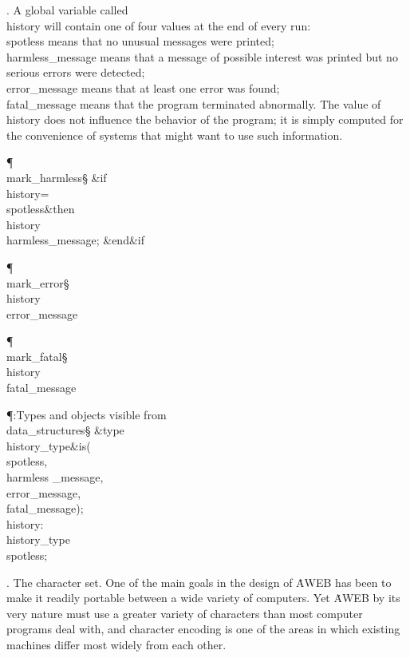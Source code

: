 . A global variable called \\{history} will contain one of four values
at the end of every run: \\{spotless} means that no unusual messages were
printed; \\{harmless\_message} means that a message of possible interest
was printed but no serious errors were detected; \\{error\_message} means that
at least one error was found; \\{fatal\_message} means that the program
terminated abnormally. The value of \\{history} does not influence the
behavior of the program; it is simply computed for the convenience
of systems that might want to use such information.

\Y\P\4\D\\{mark\_harmless}\?\S\?\6
\&{if}\1\1\8\\{history}\?=\?\\{spotless}\2\8\&{then}\6
\\{history}\?\K\?\\{harmless\_message};\2\6
\&{end}\8\2\&{if}\1\par
\P\4\D\\{mark\_error}\?\S\?\\{history}\?\K\?\\{error\_message}\par
\P\4\D\\{mark\_fatal}\?\S\?\\{history}\?\K\?\\{fatal\_message}\par
\Y\P\?\4:Types and objects visible from \\{data\_structures}\X\mathrel{+}\S%
\?\6
\&{type}\8\\{history\_type}\8\&{is}\?\8\1(\?\\{spotless}\?,\?\\{harmless%
\_message}\?,\?\\{error\_message}\?,\?\\{fatal\_message}\?\2)\?;\6
\\{history}\?:\?\\{history\_type}\?\K\?\\{spotless};%
\par
\fi

.  The character set.
One of the main goals in the design of \.{AWEB} has been to make it readily
portable between a wide variety of computers. Yet \.{AWEB} by its very
nature must use a greater variety of characters than most computer
programs deal with, and character encoding is one of the areas in which
existing machines differ most widely from each other.

